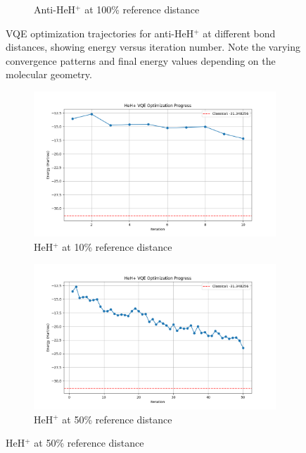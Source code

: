\documentclass[10pt,twocolumn,a4paper]{article}
\begin{document}
\begin{figure}[t!]
\begin{subfigure}[b]{0.32\textwidth}
        \caption{Anti-HeH$^+$ at 100\% reference distance}
        \label{fig:vqe_progress_anti_100}
    \end{subfigure}
    \caption{VQE optimization trajectories for anti-HeH$^+$ at different bond distances, showing energy versus iteration number. Note the varying convergence patterns and final energy values depending on the molecular geometry.}
    \label{fig:vqe_progress_anti}
\end{figure}

\begin{figure}[t!]
    \centering
    \begin{subfigure}[b]{0.32\textwidth}
        \includegraphics[width=\textwidth]{graphs/vqe_progress_heh+_10.png}
        \caption{HeH$^+$ at 10\% reference distance}
        \label{fig:vqe_progress_normal_10}
    \end{subfigure}
    \hfill
    \begin{subfigure}[b]{0.32\textwidth}
        \includegraphics[width=\textwidth]{graphs/vqe_progress_heh+_50.png}
        \caption{HeH$^+$ at 50\% reference distance}

\end{subfigure}
\end{figure}
\end{document}
